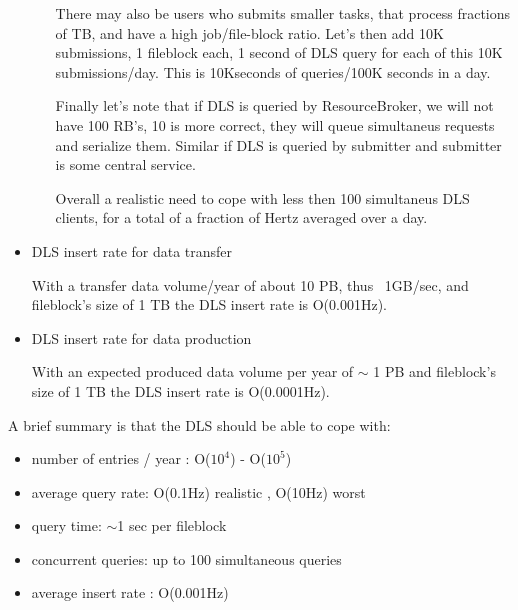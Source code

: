 \documentclass[pdftex]{cmspaper}
\begin{document}
\begin{itemize}
\begin{itemize}
There may also be users who submits smaller tasks, that process
fractions of TB, and have a high job/file-block ratio.
Let's then add 10K submissions, 1 fileblock each, 1 second of DLS query 
for each of this 10K submissions/day. This is 10Kseconds of queries/100K seconds in a day. %

Finally let's note that if DLS is queried by ResourceBroker,
we will not have 100 RB's, 10 is more correct, they will queue
simultaneus requests and serialize them. Similar if DLS is
queried by submitter and submitter is some central service.
                 
Overall a realistic need to cope with less then 100 simultaneus DLS clients, 
for a total of a fraction of Hertz averaged over a day.


 \end{itemize}
\item DLS insert rate for data transfer

With a transfer data volume/year of about 10 PB, thus ~1GB/sec,
and fileblock's size of 1 TB the DLS insert rate is O(0.001Hz).

\item DLS insert rate for data production 

With an expected produced data volume per year of $\sim$ 1 PB and
fileblock's size of 1 TB the DLS insert rate is O(0.0001Hz).  

\end{itemize}

A brief summary is that the DLS should be able to cope with:
\begin{itemize}
 \item number of entries / year  : O($10^{4}$) - O($10^{5}$)
 \item average query rate:  O(0.1Hz) realistic , O(10Hz) worst
 \item query time: $\sim$1 sec per fileblock
 \item concurrent queries: up to 100 simultaneous queries  
 \item average insert rate : O(0.001Hz)
\end{itemize}
\end{document}
